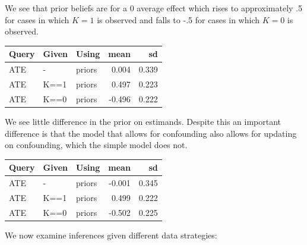 \documentclass[
  12pt,
]{book}
\begin{document}
We see that prior beliefs are for a 0 average effect which rises to approximately .5 for cases in which \(K=1\) is observed and falls to -.5 for cases in which \(K=0\) is observed.

\begin{tabular}{l|l|l|r|r}
\hline
Query & Given & Using & mean & sd\\
\hline
ATE & - & priors & 0.004 & 0.339\\
\hline
ATE & K==1 & priors & 0.497 & 0.223\\
\hline
ATE & K==0 & priors & -0.496 & 0.222\\
\hline
\end{tabular}

We see little difference in the prior on estimands. Despite this an important difference is that the model that allows for confounding also allows for updating on confounding, which the simple model does not.

\begin{tabular}{l|l|l|r|r}
\hline
Query & Given & Using & mean & sd\\
\hline
ATE & - & priors & -0.001 & 0.345\\
\hline
ATE & K==1 & priors & 0.499 & 0.222\\
\hline
ATE & K==0 & priors & -0.502 & 0.225\\
\hline
\end{tabular}

We now examine inferences given different data strategies:
\end{document}
